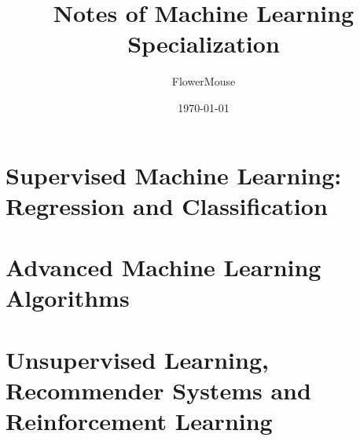 \documentclass[math,code]{amznotes}
\title{Notes of Machine Learning Specialization}
\author{FlowerMouse}
\date{\today}
\begin{document}
    \frontmatter
    \maketitle
    \thispagestyle{empty}
    
    \tableofcontents

    \mainmatter
    \part{Supervised Machine Learning: \\ Regression and Classification}
    
    
    
    
    
    
    
    \part{Advanced Machine Learning Algorithms}
    
    
    
    
    \part{Unsupervised Learning, \\Recommender Systems and\\ Reinforcement Learning}
    
    
    
    \backmatter
    \amzindex
\end{document}
